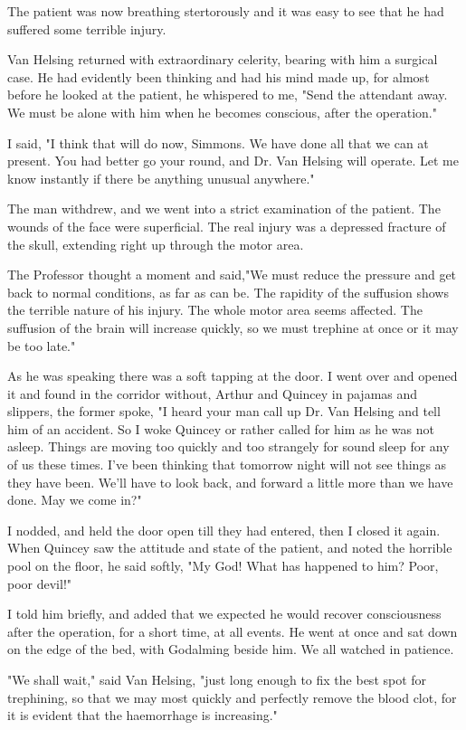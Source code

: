The patient was now breathing stertorously and it was easy to see that he had suffered some terrible injury. 

Van Helsing returned with extraordinary celerity, bearing with him a surgical case. He had evidently been thinking and had his mind made up, for almost before he looked at the patient, he whispered to me, "Send the attendant away. We must be alone with him when he becomes conscious, after the operation." 

I said, "I think that will do now, Simmons. We have done all that we can at present. You had better go your round, and Dr. Van Helsing will operate. Let me know instantly if there be anything unusual anywhere." 

The man withdrew, and we went into a strict examination of the patient. The wounds of the face were superficial. The real injury was a depressed fracture of the skull, extending right up through the motor area. 

The Professor thought a moment and said,"We must reduce the pressure and get back to normal conditions, as far as can be. The rapidity of the suffusion shows the terrible nature of his injury. The whole motor area seems affected. The suffusion of the brain will increase quickly, so we must trephine at once or it may be too late." 

As he was speaking there was a soft tapping at the door. I went over and opened it and found in the corridor without, Arthur and Quincey in pajamas and slippers, the former spoke, "I heard your man call up Dr. Van Helsing and tell him of an accident. So I woke Quincey or rather called for him as he was not asleep. Things are moving too quickly and too strangely for sound sleep for any of us these times. I've been thinking that tomorrow night will not see things as they have been. We'll have to look back, and forward a little more than we have done. May we come in?" 

I nodded, and held the door open till they had entered, then I closed it again. When Quincey saw the attitude and state of the patient, and noted the horrible pool on the floor, he said softly, "My God! What has happened to him? Poor, poor devil!" 

I told him briefly, and added that we expected he would recover consciousness after the operation, for a short time, at all events. He went at once and sat down on the edge of the bed, with Godalming beside him. We all watched in patience. 

"We shall wait," said Van Helsing, "just long enough to fix the best spot for trephining, so that we may most quickly and perfectly remove the blood clot, for it is evident that the haemorrhage is increasing." 

